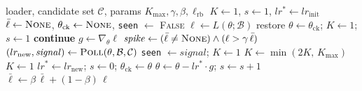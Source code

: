 \documentclass[conference]{IEEEtran}
\begin{document}
\begin{algorithm}[htbp]
\caption{Efficient Polling (one epoch)}
\label{alg:efficient}
\begin{algorithmic}[1]
\REQUIRE loader, candidate set $\mathcal{C}$, params $K_{\max}, \gamma, \beta, \ell_{\mathrm{rb}}$
\STATE $K \leftarrow 1$,\; $s \leftarrow 1$,\; $lr^{*} \leftarrow lr_{\mathrm{init}}$ 
\STATE $\bar{\ell} \leftarrow \textsc{None}$,\; $\theta_{\mathrm{ck}} \leftarrow \textsc{None}$,\; \texttt{seen} $\leftarrow$ \textsc{False}
    \STATE $\ell \leftarrow L(\theta; \mathcal{B})$
        \STATE restore $\theta \leftarrow \theta_{\mathrm{ck}}$;\; $K \leftarrow 1$;\; $s \leftarrow 1$ 
        \STATE \textbf{continue}
    \ENDIF
    \STATE $g \leftarrow \nabla_\theta \ell$
    \STATE $\mathit{spike} \leftarrow (\bar{\ell} \neq \textsc{None}) \wedge (\ell > \gamma\,\bar{\ell})$ 
        \STATE $(lr_{\mathrm{new}}, \mathit{signal}) \leftarrow \textsc{Poll}(\theta, \mathcal{B}, \mathcal{C})$
            \STATE \texttt{seen} $\leftarrow \mathit{signal}$;\; $K \leftarrow 1$
            \STATE $K \leftarrow \min(2K,\, K_{\max})$ 
        \ELSE
            \STATE $K \leftarrow 1$ 
        \ENDIF
        \STATE $lr^{*} \leftarrow lr_{\mathrm{new}}$;\; $s \leftarrow 0$;\; $\theta_{\mathrm{ck}} \leftarrow \theta$ 
    \ELSE
        \STATE $\theta \leftarrow \theta - lr^{*} \cdot g$;\; $s \leftarrow s + 1$ 
    \ENDIF
    \STATE $\bar{\ell} \leftarrow \beta\,\bar{\ell} + (1-\beta)\,\ell$ 
\ENDFOR
\end{algorithmic}
\end{algorithm}
\end{document}
